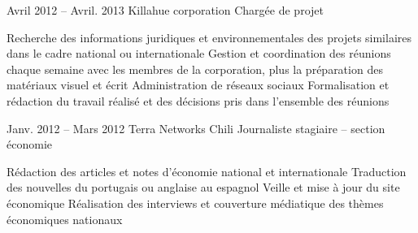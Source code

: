 \documentclass{tccv}
\begin{document}
\begin{minipage}{0.69\textwidth}
\begin{eventlist}
\item{Avril 2012 -- Avril. 2013 }     
  {Killahue corporation}     
  {Chargée de projet}

\begin{itemize}
      \setlength\itemsep{0cm} 
      \cvitem[\checkmark] Recherche des informations juridiques et environnementales des projets similaires dans le cadre national ou internationale
      \cvitem[\checkmark] Gestion et coordination des réunions chaque semaine avec les membres de la corporation, plus la préparation des matériaux visuel et écrit
      \cvitem[\checkmark] Administration de réseaux sociaux 
      \cvitem[\checkmark] Formalisation et rédaction du travail réalisé et des décisions pris dans l’ensemble des réunions

\end{itemize}      
    

\item{Janv. 2012 -- Mars 2012 }     
  {Terra Networks Chili}     
  {Journaliste stagiaire – section économie}

\begin{itemize}
      \setlength\itemsep{0cm} 
      \cvitem[\checkmark] Rédaction des articles et notes d’économie national et internationale
      \cvitem[\checkmark] Traduction des nouvelles du portugais ou anglaise au espagnol
      \cvitem[\checkmark] Veille et mise à jour du site économique
      \cvitem[\checkmark] Réalisation des interviews et couverture médiatique des thèmes économiques nationaux

\end{itemize}        
   
   


\end{eventlist}



\end{minipage}
\end{document}
